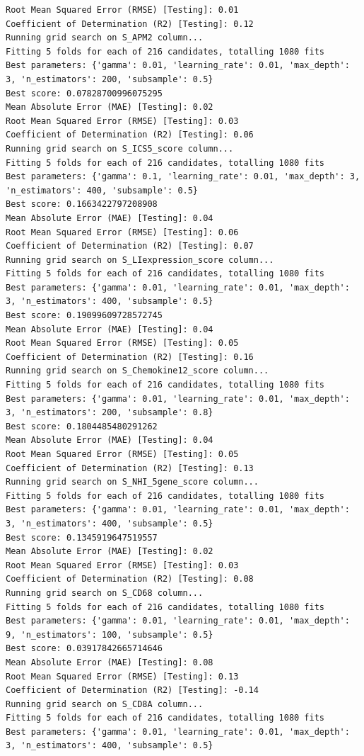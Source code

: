 \documentclass[
  letterpaper,
  DIV=11,
  numbers=noendperiod]{scrartcl}
\begin{document}
\begin{verbatim}
Root Mean Squared Error (RMSE) [Testing]: 0.01
Coefficient of Determination (R2) [Testing]: 0.12
Running grid search on S_APM2 column...
Fitting 5 folds for each of 216 candidates, totalling 1080 fits
Best parameters: {'gamma': 0.01, 'learning_rate': 0.01, 'max_depth': 3, 'n_estimators': 200, 'subsample': 0.5}
Best score: 0.07828700996075295
Mean Absolute Error (MAE) [Testing]: 0.02
Root Mean Squared Error (RMSE) [Testing]: 0.03
Coefficient of Determination (R2) [Testing]: 0.06
Running grid search on S_ICS5_score column...
Fitting 5 folds for each of 216 candidates, totalling 1080 fits
Best parameters: {'gamma': 0.1, 'learning_rate': 0.01, 'max_depth': 3, 'n_estimators': 400, 'subsample': 0.5}
Best score: 0.1663422797208908
Mean Absolute Error (MAE) [Testing]: 0.04
Root Mean Squared Error (RMSE) [Testing]: 0.06
Coefficient of Determination (R2) [Testing]: 0.07
Running grid search on S_LIexpression_score column...
Fitting 5 folds for each of 216 candidates, totalling 1080 fits
Best parameters: {'gamma': 0.01, 'learning_rate': 0.01, 'max_depth': 3, 'n_estimators': 400, 'subsample': 0.5}
Best score: 0.19099609728572745
Mean Absolute Error (MAE) [Testing]: 0.04
Root Mean Squared Error (RMSE) [Testing]: 0.05
Coefficient of Determination (R2) [Testing]: 0.16
Running grid search on S_Chemokine12_score column...
Fitting 5 folds for each of 216 candidates, totalling 1080 fits
Best parameters: {'gamma': 0.01, 'learning_rate': 0.01, 'max_depth': 3, 'n_estimators': 200, 'subsample': 0.8}
Best score: 0.1804485480291262
Mean Absolute Error (MAE) [Testing]: 0.04
Root Mean Squared Error (RMSE) [Testing]: 0.05
Coefficient of Determination (R2) [Testing]: 0.13
Running grid search on S_NHI_5gene_score column...
Fitting 5 folds for each of 216 candidates, totalling 1080 fits
Best parameters: {'gamma': 0.01, 'learning_rate': 0.01, 'max_depth': 3, 'n_estimators': 400, 'subsample': 0.5}
Best score: 0.1345919647519557
Mean Absolute Error (MAE) [Testing]: 0.02
Root Mean Squared Error (RMSE) [Testing]: 0.03
Coefficient of Determination (R2) [Testing]: 0.08
Running grid search on S_CD68 column...
Fitting 5 folds for each of 216 candidates, totalling 1080 fits
Best parameters: {'gamma': 0.01, 'learning_rate': 0.01, 'max_depth': 9, 'n_estimators': 100, 'subsample': 0.5}
Best score: 0.03917842665714646
Mean Absolute Error (MAE) [Testing]: 0.08
Root Mean Squared Error (RMSE) [Testing]: 0.13
Coefficient of Determination (R2) [Testing]: -0.14
Running grid search on S_CD8A column...
Fitting 5 folds for each of 216 candidates, totalling 1080 fits
Best parameters: {'gamma': 0.01, 'learning_rate': 0.01, 'max_depth': 3, 'n_estimators': 400, 'subsample': 0.5}

\end{verbatim}
\end{document}
